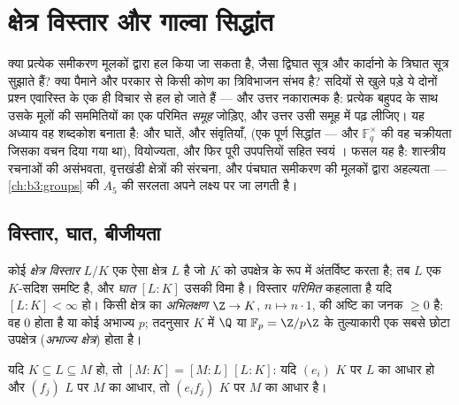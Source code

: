 \chapter{क्षेत्र विस्तार और गाल्वा सिद्धांत}\label{ch:b3:galois}

क्या प्रत्येक समीकरण मूलकों द्वारा हल किया जा सकता है, जैसा
द्विघात सूत्र और कार्दानो के त्रिघात सूत्र सुझाते हैं? क्या
पैमाने और परकार से किसी कोण का त्रिविभाजन संभव है? सदियों से खुले
पड़े ये दोनों प्रश्न एवारिस्त  के एक ही विचार से हल हो
जाते हैं --- और उत्तर नकारात्मक है: प्रत्येक बहुपद के साथ उसके
मूलों की सममितियों का एक परिमित \emph{समूह} जोड़िए, और उत्तर उसी
समूह में पढ़ लीजिए। यह अध्याय वह शब्दकोश बनाता है:  और घातें,  और  संवृतियाँ,  (एक पूर्ण सिद्धांत --- और $\mathbb F_q^\times$ की वह चक्रीयता जिसका वचन
दिया गया था), वियोज्यता, और फिर पूरी उपपत्तियों सहित स्वयं । फसल यह है: शास्त्रीय रचनाओं की असंभवता, वृत्तखंडी क्षेत्रों
की संरचना, और पंचघात समीकरण की मूलकों द्वारा अहल्यता --- \cref{ch:b3:groups} की
$A_5$ की सरलता अपने लक्ष्य पर जा लगती है।

\section{विस्तार, घात, बीजीयता}

\begin{definition}\label{def:b3:galois:extension}
कोई \emph{क्षेत्र विस्तार} $L/K$ एक ऐसा
क्षेत्र $L$ है जो $K$ को उपक्षेत्र के रूप में अंतर्विष्ट करता
है; तब $L$ एक $K$-सदिश समष्टि है, और
\emph{घात} $[L:K]$ उसकी विमा है। विस्तार
\emph{परिमित} कहलाता है यदि $[L:K] <
\infty$ हो। किसी क्षेत्र का
\emph{अभिलक्षण} $\Z \to K$, $n \mapsto n\cdot 1$, की अष्टि का जनक $\geq 0$ है: वह $0$
होता है या कोई अभाज्य $p$; तदनुसार $K$ में $\Q$ या $\mathbb
F_p = \Z/p\Z$ के
तुल्याकारी एक सबसे छोटा उपक्षेत्र (\emph{अभाज्य क्षेत्र}) होता
है।
\end{definition}

\begin{theorem}[मीनार नियम]\label{thm:b3:galois:tower}
यदि $K \subseteq L \subseteq M$ हो, तो $[M:K] = [M:L]\,[L:K]$: यदि $(e_i)$ $K$ पर $L$ का आधार हो और $(f_j)$
$L$ पर $M$ का आधार, तो $(e_if_j)$ $K$ पर $M$ का आधार
है।
\end{theorem}

